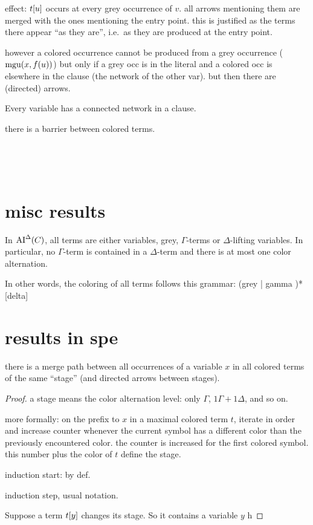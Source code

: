 \documentclass[,%
	paper=a4,%
	DIV11, %
	twoside=false,%
	liststotoc,
	bibtotoc,
	draft=false,%
	numbers=noendperiod
]{scrartcl}
\begin{document}
effect: 
$t[u]$ occurs at every grey occurrence of $v$. all arrows mentioning them are merged with the ones mentioning the entry point.
this is justified as the terms there appear ``as they are'', i.e.\ as they are produced at the entry point.

however a colored occurrence cannot be produced from a grey occurrence ($\operatorname{mgu}(x, f(u))$) but only if a grey occ is in the literal and a colored occ is elsewhere in the clause (the network of the other var). but then there are (directed) arrows.


Every variable has a connected network in a clause. 

there is a barrier between colored terms.

~

~

\clearpage
\section{misc results}

\begin{prop}
	\label{prop:no_delta_term_in_ai_delta}
	In $\operatorname{AI}^\Delta(C)$, all terms are either variables, grey, $\Gamma$-terms or $\Delta$-lifting variables. 
	In particular, no $\Gamma$-term is contained in a $\Delta$-term and there is at most one color alternation. 

	In other words, the coloring of all terms follows this grammar:
	(grey | gamma )* [delta]

\end{prop}
\section{results in spe}

\begin{clemma}
	there is a merge path between all occurrences of a variable $x$ in all colored terms of the same ``stage'' (and directed arrows between stages).
\end{clemma}
\begin{proof}
	a stage means the color alternation level: only $\Gamma$, $1 \Gamma + 1 \Delta$, and so on.

	more formally: on the prefix to $x$ in a maximal colored term $t$, iterate in order and increase counter whenever the current symbol has a different color than the previously encountered color. the counter is increased for the first colored symbol. this number plus the color of $t$ define the stage.

	induction start: by def.

	induction step, usual notation.

	Suppose a term $t[y]$ changes its stage. 
	So it contains a variable $y$ h





\end{proof}
\end{document}
